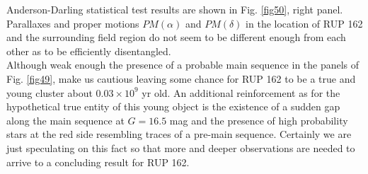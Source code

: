 \documentclass[draft]{aa}
\begin{document}
Anderson-Darling statistical test results are shown in Fig. \ref{fig50}, right
panel. Parallaxes and proper motions $PM(\alpha)$ and $PM(\delta)$ in the
location of RUP 162 and the surrounding field region do not seem to be
different enough from each other as to be efficiently disentangled.\\

Although weak enough the presence of a probable main sequence in the 
panels of Fig. \ref{fig49}, make us cautious leaving some chance for RUP 162 to
be a true and young cluster about $0.03\times10^9$ yr old. An additional
reinforcement as for the hypothetical true entity of this young object is the
existence of a sudden gap along the main sequence at $G=16.5$ mag and the
presence of high probability stars at the red side resembling traces of a
pre-main sequence. Certainly we are just speculating on this fact so that more
and deeper observations are needed to arrive to a concluding result for RUP
162.
\end{document}
